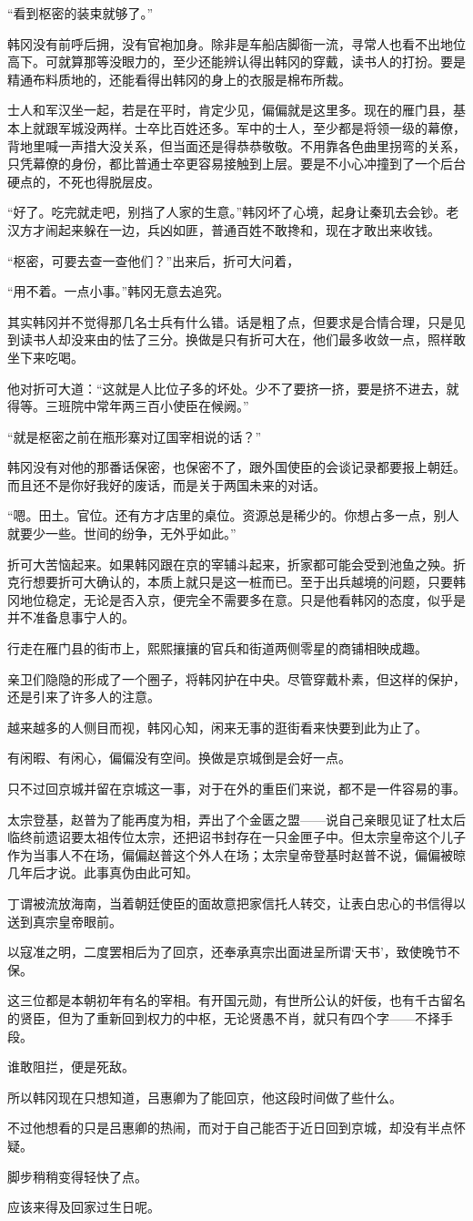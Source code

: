 “看到枢密的装束就够了。”

韩冈没有前呼后拥，没有官袍加身。除非是车船店脚衙一流，寻常人也看不出地位高下。可就算那等没眼力的，至少还能辨认得出韩冈的穿戴，读书人的打扮。要是精通布料质地的，还能看得出韩冈的身上的衣服是棉布所裁。

士人和军汉坐一起，若是在平时，肯定少见，偏偏就是这里多。现在的雁门县，基本上就跟军城没两样。士卒比百姓还多。军中的士人，至少都是将领一级的幕僚，背地里喊一声措大没关系，但当面还是得恭恭敬敬。不用靠各色曲里拐弯的关系，只凭幕僚的身份，都比普通士卒更容易接触到上层。要是不小心冲撞到了一个后台硬点的，不死也得脱层皮。

“好了。吃完就走吧，别挡了人家的生意。”韩冈坏了心境，起身让秦玑去会钞。老汉方才闹起来躲在一边，兵凶如匪，普通百姓不敢搀和，现在才敢出来收钱。

“枢密，可要去查一查他们？”出来后，折可大问着，

“用不着。一点小事。”韩冈无意去追究。

其实韩冈并不觉得那几名士兵有什么错。话是粗了点，但要求是合情合理，只是见到读书人却没来由的怯了三分。换做是只有折可大在，他们最多收敛一点，照样敢坐下来吃喝。

他对折可大道：“这就是人比位子多的坏处。少不了要挤一挤，要是挤不进去，就得等。三班院中常年两三百小使臣在候阙。”

“就是枢密之前在瓶形寨对辽国宰相说的话？”

韩冈没有对他的那番话保密，也保密不了，跟外国使臣的会谈记录都要报上朝廷。而且还不是你好我好的废话，而是关于两国未来的对话。

“嗯。田土。官位。还有方才店里的桌位。资源总是稀少的。你想占多一点，别人就要少一些。世间的纷争，无外乎如此。”

折可大苦恼起来。如果韩冈跟在京的宰辅斗起来，折家都可能会受到池鱼之殃。折克行想要折可大确认的，本质上就只是这一桩而已。至于出兵越境的问题，只要韩冈地位稳定，无论是否入京，便完全不需要多在意。只是他看韩冈的态度，似乎是并不准备息事宁人的。

行走在雁门县的街市上，熙熙攘攘的官兵和街道两侧零星的商铺相映成趣。

亲卫们隐隐的形成了一个圈子，将韩冈护在中央。尽管穿戴朴素，但这样的保护，还是引来了许多人的注意。

越来越多的人侧目而视，韩冈心知，闲来无事的逛街看来快要到此为止了。

有闲暇、有闲心，偏偏没有空间。换做是京城倒是会好一点。

只不过回京城并留在京城这一事，对于在外的重臣们来说，都不是一件容易的事。

太宗登基，赵普为了能再度为相，弄出了个金匮之盟——说自己亲眼见证了杜太后临终前遗诏要太祖传位太宗，还把诏书封存在一只金匣子中。但太宗皇帝这个儿子作为当事人不在场，偏偏赵普这个外人在场；太宗皇帝登基时赵普不说，偏偏被晾几年后才说。此事真伪由此可知。

丁谓被流放海南，当着朝廷使臣的面故意把家信托人转交，让表白忠心的书信得以送到真宗皇帝眼前。

以寇准之明，二度罢相后为了回京，还奉承真宗出面进呈所谓‘天书’，致使晚节不保。

这三位都是本朝初年有名的宰相。有开国元勋，有世所公认的奸佞，也有千古留名的贤臣，但为了重新回到权力的中枢，无论贤愚不肖，就只有四个字——不择手段。

谁敢阻拦，便是死敌。

所以韩冈现在只想知道，吕惠卿为了能回京，他这段时间做了些什么。

不过他想看的只是吕惠卿的热闹，而对于自己能否于近日回到京城，却没有半点怀疑。

脚步稍稍变得轻快了点。

应该来得及回家过生日呢。
